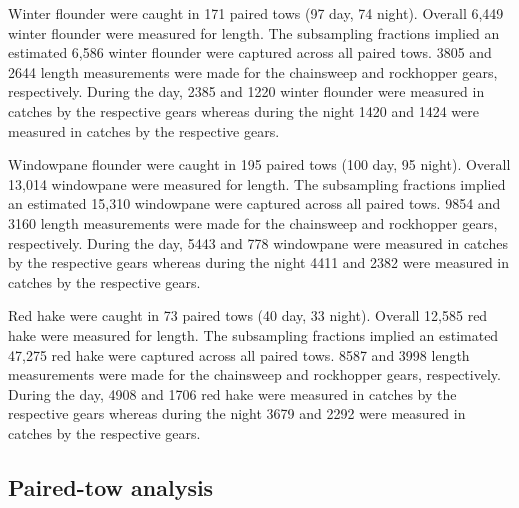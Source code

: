 \documentclass[]{article}
\begin{document}
Winter flounder were caught in 171 paired tows (97 day, 74 night).
Overall 6,449 winter flounder were measured for length. The subsampling
fractions implied an estimated 6,586 winter flounder were captured
across all paired tows. 3805 and 2644 length measurements were made for
the chainsweep and rockhopper gears, respectively. During the day, 2385
and 1220 winter flounder were measured in catches by the respective
gears whereas during the night 1420 and 1424 were measured in catches by
the respective gears.

Windowpane flounder were caught in 195 paired tows (100 day, 95 night).
Overall 13,014 windowpane were measured for length. The subsampling
fractions implied an estimated 15,310 windowpane were captured across
all paired tows. 9854 and 3160 length measurements were made for the
chainsweep and rockhopper gears, respectively. During the day, 5443 and
778 windowpane were measured in catches by the respective gears whereas
during the night 4411 and 2382 were measured in catches by the
respective gears.

Red hake were caught in 73 paired tows (40 day, 33 night). Overall
12,585 red hake were measured for length. The subsampling fractions
implied an estimated 47,275 red hake were captured across all paired
tows. 8587 and 3998 length measurements were made for the chainsweep and
rockhopper gears, respectively. During the day, 4908 and 1706 red hake
were measured in catches by the respective gears whereas during the
night 3679 and 2292 were measured in catches by the respective gears.

\hypertarget{paired-tow-analysis}{%
\subsection{Paired-tow analysis}\label{paired-tow-analysis}}
\end{document}
